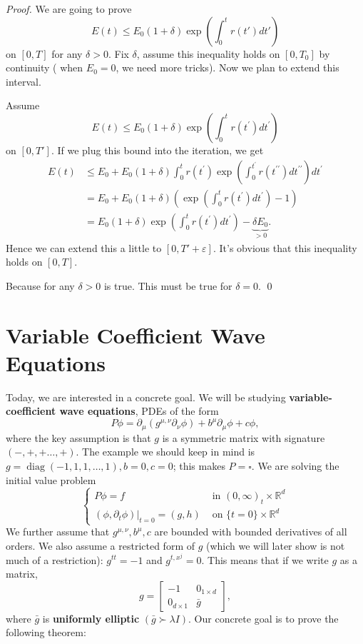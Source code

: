 \vspace{1em}
\begin{proof}
    We are going to prove 
    \[
        E(t) \le E_0(1+\delta) \exp(\int_0^t r(t') dt')
    \]
    on $[0,T]$ for any $\delta >0$. Fix $\delta$, assume this inequality holds on $[0,T_0]$ by continuity ( when $E_0=0$, we need more tricks). Now we plan to extend this interval. 

    Assume 
    $$
E(t) \leq E_{0}(1+\delta) \exp \left(\int_{0}^{t} r\left(t^{\prime}\right) d t^{\prime}\right)
$$
on $[0, T']$. If we plug this bound into the iteration, we get
$$
\begin{aligned}
E(t) & \leq E_{0}+E_{0}(1+\delta) \int_{0}^{t} r\left(t^{\prime}\right) \exp \left(\int_{0}^{t^{\prime}} r\left(t^{\prime \prime}\right) d t^{\prime \prime}\right) d t^{\prime} \\
&=E_{0}+E_{0}(1+\delta)\left(\exp \left(\int_{0}^{t} r\left(t^{\prime}\right) d t^{\prime}\right)-1\right) \\
&=E_{0}(1+\delta) \exp \left(\int_{0}^{t} r\left(t^{\prime}\right) d t^{\prime}\right)-\underbrace{\delta E_{0}}_{>0}.
\end{aligned}
$$
Hence we can extend this a little to $[0,T'+\varepsilon]$. It's obvious that this inequality holds on $[0,T]$.  

Because for any $\delta >0$ is true. This must be true for $\delta =0$. 
\qed 
\end{proof}


\newpage 
\section{Variable Coefficient Wave Equations}

Today, we are interested in a concrete goal. We will be studying \textbf{variable-coefficient wave equations}, PDEs of the form
$$
P \phi=\partial_{\mu}\left(g^{\mu, \nu} \partial_{\nu} \phi\right)+b^{\mu} \partial_{\mu} \phi+c \phi,
$$
where the key assumption is that $g$ is a symmetric matrix with signature $(-,+,+\ldots,+)$. The example we should keep in mind is $g=\operatorname{diag}(-1,1,1, \ldots, 1), b=0, c=0$; this makes $P=\square$. We are solving the initial value problem
$$
\begin{cases}P \phi=f & \text { in }(0, \infty)_{t} \times \mathbb{R}^{d} \\ \left.\left(\phi, \partial_{t} \phi\right)\right|_{t=0}=(g, h) & \text { on }\{t=0\} \times \mathbb{R}^{d}\end{cases}
$$
We further assume that $g^{\mu, \nu}, b^{\mu}, c$ are bounded with bounded derivatives of all orders. We also assume a restricted form of $g$ (which we will later show is not much of a restriction): $g^{t t}=-1$ and $g^{t, x^{j}}=0$. This means that if we write $g$ as a matrix,
$$
g=\left[\begin{array}{cc}
-1 & 0_{1 \times d} \\
0_{d \times 1} & \bar{g}
\end{array}\right],
$$
where $\bar{g}$ is \textbf{uniformly elliptic} $(\bar{g} \succ \lambda I)$.
Our concrete goal is to prove the following theorem:

